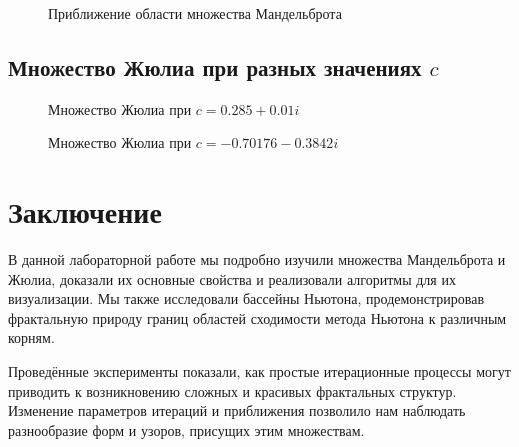 \documentclass{article}
\begin{document}
	\begin{figure}[H]
		\centering
		\caption{Приближение области множества Мандельброта}
		\label{fig:mandelbrot_zoom1}
	\end{figure}
	
	\subsection{Множество Жюлиа при разных значениях $c$}
	\begin{figure}[H]
		\centering
		\caption{Множество Жюлиа при $c = 0.285 + 0.01i$}
		\label{fig:julia_c1}
	\end{figure}
	
	\begin{figure}[H]
		\centering
		\caption{Множество Жюлиа при $c = -0.70176 - 0.3842i$}
		\label{fig:julia_c2}
	\end{figure}
	
	\newpage
	
	\section{Заключение}
	В данной лабораторной работе мы подробно изучили множества Мандельброта и Жюлиа, доказали их основные свойства и реализовали алгоритмы для их визуализации. Мы также исследовали бассейны Ньютона, продемонстрировав фрактальную природу границ областей сходимости метода Ньютона к различным корням.
	
	Проведённые эксперименты показали, как простые итерационные процессы могут приводить к возникновению сложных и красивых фрактальных структур. Изменение параметров итераций и приближения позволило нам наблюдать разнообразие форм и узоров, присущих этим множествам.

	
\end{document}
